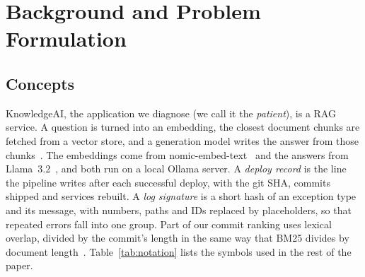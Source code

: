 \documentclass[12pt,onecolumn,draftclsnofoot]{IEEEtran}
\begin{document}
\section{Background and Problem Formulation}\label{sec:background}

\subsection{Concepts}
KnowledgeAI, the application we diagnose (we call it the \emph{patient}), is a RAG service. A question is turned into an embedding, the closest document chunks are fetched from a vector store, and a generation model writes the answer from those chunks~\cite{lewis2020rag}. The embeddings come from nomic-embed-text~\cite{nussbaum2024nomic} and the answers from Llama~3.2~\cite{grattafiori2024llama3}, and both run on a local Ollama server. A \emph{deploy record} is the line the pipeline writes after each successful deploy, with the git SHA, commits shipped and services rebuilt. A \emph{log signature} is a short hash of an exception type and its message, with numbers, paths and IDs replaced by placeholders, so that repeated errors fall into one group. Part of our commit ranking uses lexical overlap, divided by the commit's length in the same way that BM25 divides by document length~\cite{robertson2009bm25}. Table~\ref{tab:notation} lists the symbols used in the rest of the paper.
\end{document}
